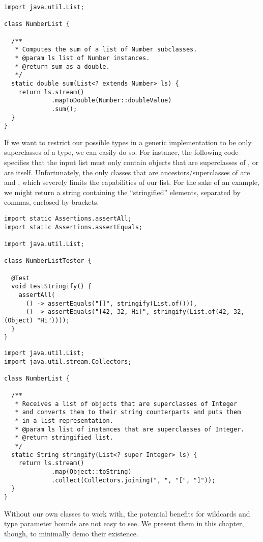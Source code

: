 \begin{lstlisting}[language=MyJava]
import java.util.List;

class NumberList {

  /**
   * Computes the sum of a list of Number subclasses.
   * @param ls list of Number instances.
   * @return sum as a double.
   */
  static double sum(List<? extends Number> ls) {
    return ls.stream()
             .mapToDouble(Number::doubleValue)
             .sum();
  }
}
\end{lstlisting}

If we want to restrict our possible types in a generic implementation to be only superclasses of a type, we can easily do so. 
For instance, the following code specifies that the input list must only contain objects that are superclasses of , or are  itself. 
Unfortunately, the only classes that are ancestors/superclasses of  are  and , which severely limits the capabilities of our list. 
For the sake of an example, we might return a string containing the ``stringified'' elements, separated by commas, enclosed by brackets.

\enlargethispage{-1\baselineskip}
\begin{lstlisting}[language=MyJava]
import static Assertions.assertAll;
import static Assertions.assertEquals;

import java.util.List;

class NumberListTester {

  @Test
  void testStringify() {
    assertAll(
      () -> assertEquals("[]", stringify(List.of())),
      () -> assertEquals("[42, 32, Hi]", stringify(List.of(42, 32, (Object) "Hi"))));
  }
}
\end{lstlisting}

\begin{lstlisting}[language=MyJava]
import java.util.List;
import java.util.stream.Collectors;

class NumberList {

  /**
   * Receives a list of objects that are superclasses of Integer
   * and converts them to their string counterparts and puts them
   * in a list representation.
   * @param ls list of instances that are superclasses of Integer.
   * @return stringified list.
   */
  static String stringify(List<? super Integer> ls) {
    return ls.stream()
             .map(Object::toString)
             .collect(Collectors.joining(", ", "[", "]"));
  }
}
\end{lstlisting}

Without our own classes to work with, the potential benefits for wildcards and type parameter bounds are not easy to see.
We present them in this chapter, though, to minimally demo their existence.